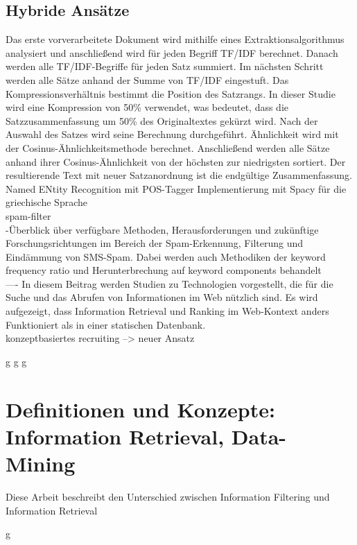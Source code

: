 \subsection{Hybride Ansätze}
Das erste vorverarbeitete Dokument wird mithilfe eines Extraktionsalgorithmus
analysiert und anschließend wird für jeden Begriff TF/IDF berechnet.
Danach werden alle TF/IDF-Begriffe für jeden Satz summiert.
Im nächsten Schritt werden alle Sätze anhand der Summe von TF/IDF eingestuft.
Das Kompressionsverhältnis bestimmt die Position des Satzrangs. In dieser Studie wird eine Kompression von 50\% verwendet, was bedeutet,
dass die Satzzusammenfassung um 50\% des Originaltextes gekürzt wird. Nach der Auswahl des Satzes wird seine Berechnung durchgeführt.
Ähnlichkeit wird mit der Cosinus-Ähnlichkeitsmethode berechnet. 
Anschließend werden alle Sätze anhand ihrer Cosinus-Ähnlichkeit von der höchsten zur niedrigsten sortiert.
Der resultierende Text mit
neuer Satzanordnung ist die endgültige Zusammenfassung.\cite{darmawan2015hybrid}\\


Named ENtity Recognition mit POS-Tagger Implementierung mit Spacy für die griechische Sprache\cite{partalidou2019design}\\

spam-filter\\
-Überblick über verfügbare Methoden, Herausforderungen und zukünftige Forschungsrichtungen im Bereich der Spam-Erkennung, Filterung und Eindämmung von SMS-Spam. Dabei werden auch Methodiken der keyword frequency ratio und Herunterbrechung auf keyword components behandelt \cite{shafi2017review}\\

----
In diesem Beitrag werden Studien zu Technologien vorgestellt, die für die Suche und das Abrufen von Informationen im Web nützlich sind. Es wird aufgezeigt, dass Information Retrieval und Ranking im Web-Kontext anders Funktioniert als in einer statischen Datenbank. \cite{kobayashi2000information}\\

konzeptbasiertes recruiting --> neuer Ansatz

\newpage
g
\newpage
g
\newpage
g
\newpage

\section{Definitionen und Konzepte: Information Retrieval, Data-Mining}
\label{sec:definitionen-konzepte}

Diese Arbeit beschreibt den Unterschied zwischen Information Filtering und Information Retrieval\cite{belkin1992information}

\newpage
g
\newpage





